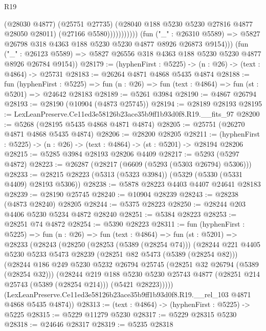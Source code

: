\begin{lexlean}{R19}
\begin{coremodule}
                              (@28030 @4877)
                              (@25751 @27735)
                              (@28040 @188 @5230 @5230 @27816 @4877 @28050 @28011)
                              (@27166 @5580)))))))))))
          (fun ("_" : @26310 @5589) =>
          @5827 @26798 @318 @4363 @188 @5230 @5230 @4877 @8926 @26873 @9154)))
      (fun ("_" : @26123 @5589) =>
      @5827 @26556 @318 @4363 @188 @5230 @5230 @4877 @8926 @26784 @9154))
@28179 := (hyphenFirst : @5225) -> (n : @26) -> (text : @4864) -> @25731
@28183 := @26264 @4871 @4868 @5435 @4874
@28188 := fun (hyphenFirst : @5225) =>
  fun (n : @26) => fun (text : @4864) => fun (st : @5201) => @24642 @28183
@28189 := @5261 @3984
@28190 := @4867 @26794
@28193 := @28190 (@10904 (@4873 @25745))
@28194 := @28189 @28193
@28195 := LexLeanPreserve.Ce11ed3e58126b23ace35b9ff1b93d0f8.R19.__fits_97
@28200 := @5268 (@28195 @5435 @4868 @4871 @4874)
@28205 := @25751 (@26270 @4871 @4868 @5435 @4874)
@28206 := @28200 @28205
@28211 := (hyphenFirst : @5225) -> (n : @26) -> (text : @4864) -> (st : @5201) -> @28194 @28206
@28215 := @5285 @3984 @28193 @28206 @4409
@28217 := @5293 (@5297 @4872)
@28223 := @26287 (@28217 (@6609 (@5293 (@5303 @26794) @5306)))
@28233 := @28215 @28223 (@5313 (@5323 @3984)) (@5329 (@5330 (@5331 @4409) @28193 @5306))
@28238 := @5878 @28223 @4403 @4407 @24641 @28183
@28239 := @28190 @25745
@28240 := @10904 @28239
@28243 := @28238 (@4873 @28240) @28205
@28244 := @5375 @28223
@28250 := @28244 @203 @4406 @5230 @5234 @4872 @28240
@28251 := @5384 @28223
@28253 := @28251 @74 @4872
@28254 := @5390 @28223
@28311 := fun (hyphenFirst : @5225) =>
  fun (n : @26) =>
  fun (text : @4864) =>
  fun (st : @5201) =>
  @28233
    (@28243
      (@28250
        (@28253 (@5389 (@28254 @74)))
        (@28244
          @221
          @4405
          @5230
          @5233
          @5473
          @28239
          (@28251 @82 @5473 (@5389 (@28254 @82)))
          (@28244
            @186
            @249
            @5230
            @5232
            @26794
            @25745
            (@28251 @32 @26794 (@5389 (@28254 @32)))
            (@28244
              @219
              @188
              @5230
              @5230
              @25743
              @4877
              (@28251 @214 @25743 (@5389 (@28254 @214)))
              (@5421 @28223)))))
      (LexLeanPreserve.Ce11ed3e58126b23ace35b9ff1b93d0f8.R19.__rel_103 @4871 @4868 @5435 @4874))
@28313 := (text : @4864) -> (hyphenFirst : @5225) -> @5225
@28315 := @5229 @11279 @5230
@28317 := @5229 @28315 @5230
@28318 := @24646 @28317
@28319 := @5235 @28318

\end{coremodule}
\end{lexlean}
